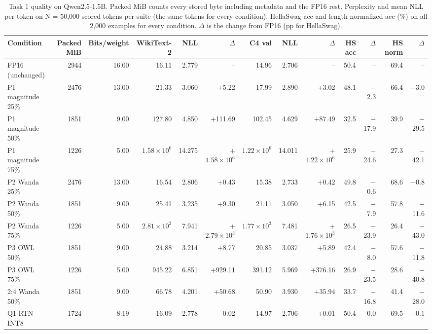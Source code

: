 \begin{table}[!htb]
\centering
\scriptsize
\setlength{\tabcolsep}{3.5pt}
\caption{Task 1 quality on Qwen2.5-1.5B. Packed MiB counts every stored byte including metadata and the FP16 rest. Perplexity and mean NLL per token on N = 50,000 scored tokens per suite (the same tokens for every condition). HellaSwag acc and length-normalized acc (\%) on all 2,000 examples for every condition. $\Delta$ is the change from FP16 (pp for HellaSwag).}
\label{tab:t1main}
\begin{adjustbox}{max width=\linewidth}
\begin{tabular}{lrrrrrrrrrrrr}
\toprule
Condition & Packed MiB & Bits/weight & WikiText-2 & NLL & $\Delta$ & C4 val & NLL & $\Delta$ & HS acc & $\Delta$ & HS norm & $\Delta$ \\
\midrule
FP16 (unchanged) & 2944 & 16.00 & 16.11 & 2.779 & -- & 14.96 & 2.706 & -- & 50.4 & -- & 69.4 & -- \\
\midrule
P1 magnitude 25\% & 2476 & 13.00 & 21.33 & 3.060 & +5.22 & 17.99 & 2.890 & +3.02 & 48.1 & $-$2.3 & 66.4 & $-$3.0 \\
P1 magnitude 50\% & 1851 & 9.00 & 127.80 & 4.850 & +111.69 & 102.45 & 4.629 & +87.49 & 32.5 & $-$17.9 & 39.9 & $-$29.5 \\
P1 magnitude 75\% & 1226 & 5.00 & $1.58\times10^{6}$ & 14.275 & +$1.58\times10^{6}$ & $1.22\times10^{6}$ & 14.011 & +$1.22\times10^{6}$ & 25.9 & $-$24.6 & 27.3 & $-$42.1 \\
P2 Wanda 25\% & 2476 & 13.00 & 16.54 & 2.806 & +0.43 & 15.38 & 2.733 & +0.42 & 49.8 & $-$0.6 & 68.6 & $-$0.8 \\
P2 Wanda 50\% & 1851 & 9.00 & 25.41 & 3.235 & +9.30 & 21.11 & 3.050 & +6.15 & 42.5 & $-$7.9 & 57.8 & $-$11.6 \\
P2 Wanda 75\% & 1226 & 5.00 & $2.81\times10^{3}$ & 7.941 & +$2.79\times10^{3}$ & $1.77\times10^{3}$ & 7.481 & +$1.76\times10^{3}$ & 26.5 & $-$23.9 & 26.4 & $-$43.0 \\
P3 OWL 50\% & 1851 & 9.00 & 24.88 & 3.214 & +8.77 & 20.85 & 3.037 & +5.89 & 42.4 & $-$8.0 & 57.6 & $-$11.8 \\
P3 OWL 75\% & 1226 & 5.00 & 945.22 & 6.851 & +929.11 & 391.12 & 5.969 & +376.16 & 26.9 & $-$23.5 & 28.6 & $-$40.8 \\
2:4 Wanda 50\% & 1851 & 9.00 & 66.78 & 4.201 & +50.68 & 50.90 & 3.930 & +35.94 & 33.7 & $-$16.8 & 41.4 & $-$28.0 \\
\midrule
Q1 RTN INT8 & 1724 & 8.19 & 16.09 & 2.778 & $-$0.02 & 14.97 & 2.706 & +0.01 & 50.4 & 0.0 & 69.5 & +0.1 \\

\end{tabular}
\end{adjustbox}
\end{table}
